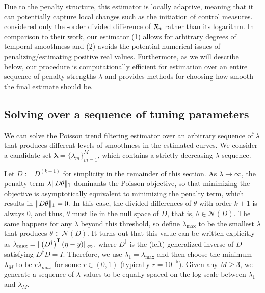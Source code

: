 Due to the penalty structure, this estimator is locally adaptive,
meaning that it can potentially capture local changes such as the initiation of
control measures. \cite{abry2020spatial,pascal2022nonsmooth} considered only the
\second-order divided difference of $\mathcal{R}_t$ rather than its logarithm. In
comparison to their work, our estimator (1) allows for arbitrary degrees of
temporal smoothness and (2) avoids the potential numerical issues of
penalizing/estimating positive real values. Furthermore, as we will describe
below, our procedure is computationally efficient for estimation over an entire
sequence of penalty strengths $\lambda$ and provides methods for choosing how
smooth the final estimate should be.


\subsection{Solving over a sequence of tuning parameters}
\label{sec:candidate-set}

We can solve the Poisson trend filtering estimator over an arbitrary sequence of 
$\lambda$ that produces different levels of smoothness in the estimated curves. 
We consider a candidate set $\boldsymbol{\lambda} = \{\lambda_m\}_{m=1}^M$, which contains a strictly decreasing $\lambda$ sequence.%

Let $D := D^{(k+1)}$ for simplicity in the remainder of this section. As
$\lambda \to\infty$, the penalty term $\lambda \lVert D\theta \rVert_1$ dominants the
Poisson objective, so that minimizing the objective is asymptotically equivalent
to minimizing the penalty term, which results in $\lVert D\theta \rVert_1 = 0$. In
this case, the divided differences of $\theta$ with order $k+1$ is always $0$,
and thus, $\theta$ must lie in the null space of $D$, that is,
$\theta\in\mathcal{N}(D)$. The same happens for any $\lambda$ beyond this
threshold, so define $\lambda_{\textrm{max}}$ to be the smallest $\lambda$ that
produces $\theta\in\mathcal{N}(D)$. It turns out that this value can be written
explicitly as $\lambda_{\textrm{max}} = \lVert \left(D^{\dagger}\right)^{\mathsf{T}} \left(\eta
- y\right) \rVert_{\infty},$ where $D^{\dagger}$ is the (left) generalized inverse of $D$
satisfying $D^{\dagger} D = I$. Therefore, we use $\lambda_1 =
\lambda_{\textrm{max}}$ and then choose the minimum $\lambda_M$ to be
$r\lambda_{max}$ for some $r \in (0,1)$ (typically $r=10^{-5}$). Given any
$M\geq 3$, we generate a sequence of $\lambda$ values to be equally spaced on
the log-scale between $\lambda_1$ and $\lambda_M$. 

